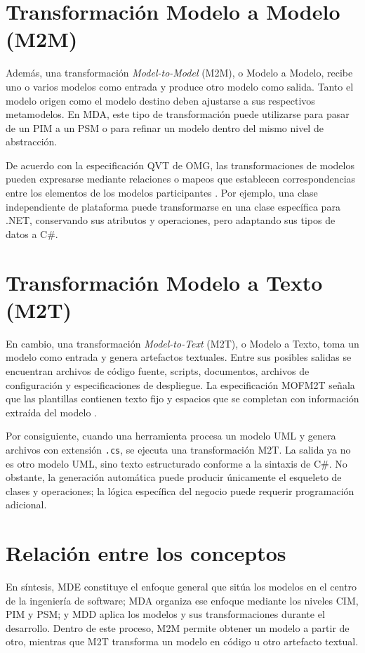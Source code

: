 \documentclass[12pt,a4paper]{article}
\begin{document}
\section{Transformación Modelo a Modelo (M2M)}

Además, una transformación \textit{Model-to-Model} (M2M), o Modelo a Modelo, recibe uno o varios modelos como entrada y produce otro modelo como salida. Tanto el modelo origen como el modelo destino deben ajustarse a sus respectivos metamodelos. En MDA, este tipo de transformación puede utilizarse para pasar de un PIM a un PSM o para refinar un modelo dentro del mismo nivel de abstracción.

De acuerdo con la especificación QVT de OMG, las transformaciones de modelos pueden expresarse mediante relaciones o mapeos que establecen correspondencias entre los elementos de los modelos participantes \cite{omg2016qvt}. Por ejemplo, una clase independiente de plataforma puede transformarse en una clase específica para .NET, conservando sus atributos y operaciones, pero adaptando sus tipos de datos a C\#.

\section{Transformación Modelo a Texto (M2T)}

En cambio, una transformación \textit{Model-to-Text} (M2T), o Modelo a Texto, toma un modelo como entrada y genera artefactos textuales. Entre sus posibles salidas se encuentran archivos de código fuente, scripts, documentos, archivos de configuración y especificaciones de despliegue. La especificación MOFM2T señala que las plantillas contienen texto fijo y espacios que se completan con información extraída del modelo \cite{omg2008m2t}.

Por consiguiente, cuando una herramienta procesa un modelo UML y genera archivos con extensión \texttt{.cs}, se ejecuta una transformación M2T. La salida ya no es otro modelo UML, sino texto estructurado conforme a la sintaxis de C\#. No obstante, la generación automática puede producir únicamente el esqueleto de clases y operaciones; la lógica específica del negocio puede requerir programación adicional.

\section{Relación entre los conceptos}

En síntesis, MDE constituye el enfoque general que sitúa los modelos en el centro de la ingeniería de software; MDA organiza ese enfoque mediante los niveles CIM, PIM y PSM; y MDD aplica los modelos y sus transformaciones durante el desarrollo. Dentro de este proceso, M2M permite obtener un modelo a partir de otro, mientras que M2T transforma un modelo en código u otro artefacto textual.
\end{document}
